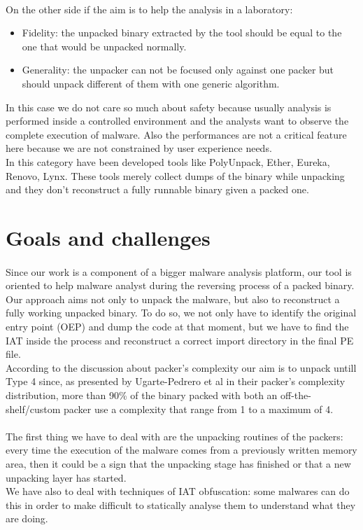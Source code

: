 \paragraph{}
On the other side if the aim is to help the analysis in a laboratory:
\begin{itemize}
\item Fidelity: the unpacked binary extracted by the tool should be equal to the one that would be unpacked normally. 
\item Generality: the unpacker can not be focused only against one packer but should unpack different of them with one generic algorithm.
\end{itemize}
In this case we do not care so much about safety because usually analysis is performed inside a controlled environment and the analysts want to observe the complete execution of malware. Also the performances are not a critical feature here because we are not constrained by user experience needs.\\
In this category have been developed tools like PolyUnpack, Ether, Eureka, Renovo, Lynx.
These tools merely collect dumps of the binary while unpacking and they don't reconstruct a fully runnable binary given a packed one.


\section{Goals and challenges}
\paragraph{}
Since our work is a component of a bigger malware analysis platform\cite{jackdaw}, our tool is oriented to help malware analyst during the reversing process of a packed binary. 
Our approach aims not only to unpack the malware, but also to reconstruct a fully working unpacked binary. To do so, we not only have to identify the original entry point (OEP) and dump the code at that moment, but we have to find the IAT inside the process and reconstruct a correct import directory in the final PE file.\\
According to the discussion about packer's complexity our aim is to unpack untill Type 4 since, as presented by Ugarte-Pedrero et al\cite{sokpacker} in their packer's complexity distribution, more than 90\% of the binary packed with both an off-the-shelf/custom packer use a complexity that range from 1 to a maximum of 4.
\paragraph{}
The first thing we have to deal with are the unpacking routines of the packers: every time the execution of the malware comes from a previously written memory area, then it could be a sign that the unpacking stage has finished or that a new unpacking layer has started.\\
We have also to deal with techniques of IAT obfuscation: some malwares can do this in order to make difficult to statically analyse them to understand what they are doing.

